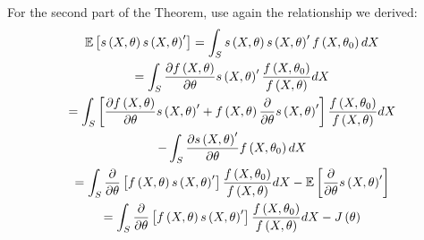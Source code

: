 \documentclass[notes=show]{beamer}
\begin{document}
\begin{frame}%


For the second part of the Theorem, use again the relationship we derived:%
\begin{gather*}
\mathbb{E}\left[ s\left( X,\theta \right) s\left( X,\theta \right) ^{\prime }%
\right] =\int_{S}s\left( X,\theta \right) s\left( X,\theta \right) ^{\prime
}f\left( X,\theta _{0}\right) dX \\
=\int_{S}\frac{\partial f\left( X,\theta \right) }{\partial \theta }s\left(
X,\theta \right) ^{\prime }\frac{f\left( X,\theta _{0}\right) }{f\left(
X,\theta \right) }dX \\
=\int_{S}\left[ \frac{\partial f\left( X,\theta \right) }{\partial \theta }%
s\left( X,\theta \right) ^{\prime }+f\left( X,\theta \right) \frac{\partial 
}{\partial \theta }s\left( X,\theta \right) ^{\prime }\right] \frac{f\left(
X,\theta _{0}\right) }{f\left( X,\theta \right) }dX \\
-\int_{S}\frac{\partial s\left( X,\theta \right) ^{\prime }}{\partial \theta 
}f\left( X,\theta _{0}\right) dX \\
=\int_{S}\frac{\partial }{\partial \theta }\left[ f\left( X,\theta \right)
s\left( X,\theta \right) ^{\prime }\right] \frac{f\left( X,\theta
_{0}\right) }{f\left( X,\theta \right) }dX-\mathbb{E}\left[ \frac{\partial }{%
\partial \theta }s\left( X,\theta \right) ^{\prime }\right]  \\
=\int_{S}\frac{\partial }{\partial \theta }\left[ f\left( X,\theta \right)
s\left( X,\theta \right) ^{\prime }\right] \frac{f\left( X,\theta
_{0}\right) }{f\left( X,\theta \right) }dX-J\left( \theta \right) 
\end{gather*}

\end{frame}%
\end{document}
